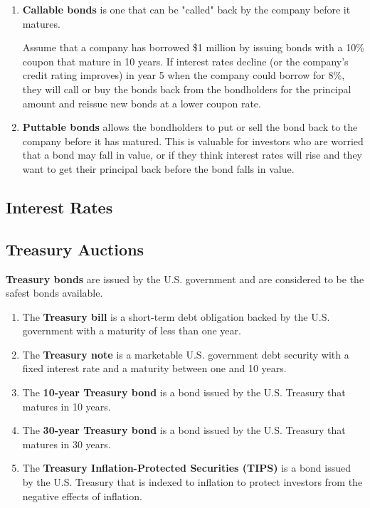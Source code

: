 \documentclass{article}
\begin{document}
\begin{definition}
\begin{enumerate}
        \item \textbf{Callable bonds} is one that can be "called" back by the company before it matures. 
        
        Assume that a company has borrowed \$1 million by issuing bonds with a 10\% coupon that mature in 10 years. If interest rates decline (or the company’s credit rating improves) in year 5 when the company could borrow for 8\%, they will call or buy the bonds back from the bondholders for the principal amount and reissue new bonds at a lower coupon rate. 
        
        \item \textbf{Puttable bonds} allows the bondholders to put or sell the bond back to the company before it has matured. This is valuable for investors who are worried that a bond may fall in value, or if they think interest rates will rise and they want to get their principal back before the bond falls in value.
      \end{enumerate}
    \end{definition}

  \subsection{Interest Rates}

  \subsection{Treasury Auctions}

    \begin{definition}
      \label{def:treasury-bonds}
      \textbf{Treasury bonds} are issued by the U.S. government and are considered to be the safest bonds available. 
      \begin{enumerate}
        \item The \textbf{Treasury bill} is a short-term debt obligation backed by the U.S. government with a maturity of less than one year. 
        \item The \textbf{Treasury note} is a marketable U.S. government debt security with a fixed interest rate and a maturity between one and 10 years.
        \item The \textbf{10-year Treasury bond} is a bond issued by the U.S. Treasury that matures in 10 years. 
        \item The \textbf{30-year Treasury bond} is a bond issued by the U.S. Treasury that matures in 30 years. 
        \item The \textbf{Treasury Inflation-Protected Securities (TIPS)} is a bond issued by the U.S. Treasury that is indexed to inflation to protect investors from the negative effects of inflation. 
      \end{enumerate}
    \end{definition}
\end{document}
